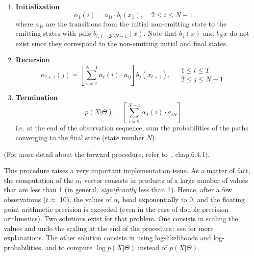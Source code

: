 \documentclass[twoside,a4paper,titlepage]{article}
\begin{document}
\begin{itemize}
\pagebreak
\noindent {}
\begin{enumerate}
\item {\bf Initialization}
%
	\[
		\alpha_1(i) = a_{1i} \cdot b_i(x_1), \;\;\;\; 2 \leq i \leq N-1
	\]
%
where $a_{1i}$ are the transitions from the initial non-emitting state to
the emitting states with pdfs $b_{i,\,i = 2 \cdots N-1}(x)$. Note that
$b_1(x)$ and $b_N{x}$ do not exist since they correspond to the
non-emitting initial and final states.
\item {\bf Recursion}
	\[
		\alpha_{t+1}(j) = \left[ \sum_{i=2}^{N-1} \alpha_{t}(i) \cdot a_{ij} \right] b_j(x_{t+1}),
		\;\;\;\; \begin{array}{l} 1 \leq t \leq T \\ 2 \leq j \leq N-1 \end{array}
	\]
\item {\bf Termination}
	\[
		p(X|\Theta) = \left[ \sum_{i=2}^{N-1} \alpha_{T}(i) \cdot a_{iN} \right]
	\]
%
i.e. at the end of the observation sequence, sum the probabilities of the
paths converging to the final state (state number $N$).
\end{enumerate}
(For more detail about the forward procedure, refer to~\cite{RAB93},
chap.6.4.1).

This procedure raises a very important implementation issue. As a matter of
fact, the computation of the $\alpha_t$ vector consists in products of a
large number of values that are less than 1 (in general, {\em
significantly} less than 1). Hence, after a few observations ($t \approx$
10), the values of $\alpha_t$ head exponentially to 0, and the floating
point arithmetic precision is exceeded (even in the case of double
precision arithmetics). Two solutions exist for that problem. One consists
in scaling the values and undo the scaling at the end of the procedure\,:
see \cite{RAB93} for more explanations. The other solution consists in
using log-likelihoods and log-probabilities, and to compute $\log
p(X|\Theta)$ instead of $p(X|\Theta)$.
\end{itemize}
\end{document}
